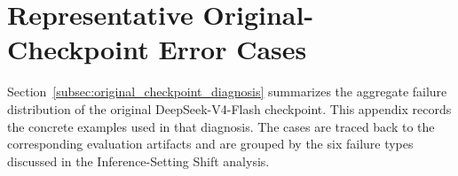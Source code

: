 








\newpage
\section{Representative Original-Checkpoint Error Cases}
\label{app:original_checkpoint_error_cases}

\raggedbottom

Section~\ref{subsec:original_checkpoint_diagnosis} summarizes the aggregate
failure distribution of the original DeepSeek-V4-Flash checkpoint. This
appendix records the concrete examples used in that diagnosis. The cases are
traced back to the corresponding evaluation artifacts and are grouped by the
six failure types discussed in the Inference-Setting Shift analysis.

